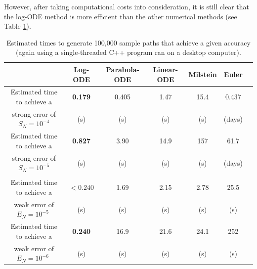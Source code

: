 \documentclass[sn-mathphys-num]{sn-jnl}%
\newcommand{\m}{\hspace{0.25mm}}
\begin{document}
However, after taking computational costs into consideration, it is still clear that the log-ODE method is more efficient than the other numerical methods (see Table \ref{tab:igbm_time_to_acheive}).\vspace{-2mm}
\begin{table}[ht]
    \centering
    \begin{tabular}{@{}ccccccc@{}}
    \toprule
     \hspace*{-2.5mm} & Log-ODE  & Parabola-ODE & Linear-ODE  & Milstein & Euler \\ \midrule
   Estimated time to achieve a\hspace*{-1.75mm} & \textbf{0.179} & 0.405 & 1.47 & 15.4 & 0.437 \\
   strong error of $S_N = 10^{-4}$ & (s) & (s) & (s) & (s) & (days)\\[4pt]
     Estimated time to achieve a\hspace*{-1.75mm} & \textbf{0.827} & 3.90 & 14.9 & 157 & 61.7 \\
   strong error of $S_N = 10^{-5}$  & (s) & (s) & (s) & (s) & (days)\\[2pt]
   	 \midrule\\[-8pt]
   	 Estimated time to achieve a\hspace*{-1.75mm} & $\boldsymbol{<}\mathbf{0.240}$ & 1.69 & 2.15 & 2.78 & 25.5 \\
   weak error of $E_N = 10^{-5}$\,\,\m & (s) & (s) & (s) & (s) & (s)\\[4pt]
     Estimated time to achieve a\hspace*{-1.75mm} & \textbf{0.240} & 16.9 & 21.6 & 24.1 & 252 \\
   weak error of $E_N = 10^{-6}$\,\,\m & (s) & (s) & (s) & (s) & (s)\\[2pt]
     \bottomrule
    \end{tabular}\medbreak
    \caption{Estimated times to generate 100,000 sample paths that achieve a
given accuracy (again using a single-threaded C++ program ran on a desktop computer).}\label{tab:igbm_time_to_acheive}
\end{table}\vspace*{-1mm}
\end{document}
